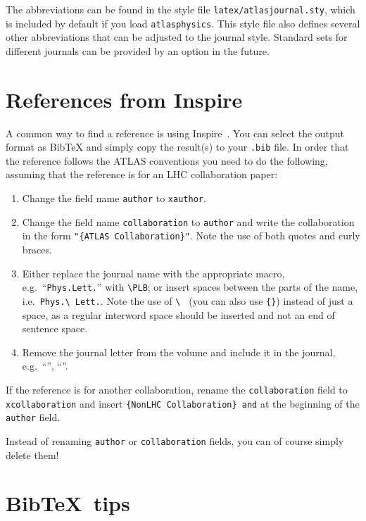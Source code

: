 \documentclass[UKenglish]{latex/atlasdoc}
\newcommand*{\BibTeX}{Bib\TeX}
\newcommand{\File}[1]{\texttt{#1}\xspace}
\newcommand{\Package}[1]{\texttt{#1}\xspace}
\begin{document}
The abbreviations can be found in the style file \File{latex/atlasjournal.sty},
which is included by default if you load \Package{atlasphysics}.
This style file also defines several other abbreviations that can be adjusted to the
journal style. 
Standard sets for different journals can be provided by an option in the future.

\section{References from Inspire}
\label{sc:inquire}

A common way to find a reference is using Inspire~\cite{inspire}.
You can select the output format as BibTeX and simply copy the result(s) to your \File{.bib} file.
In order that the reference follows the ATLAS conventions you need to do the following,
assuming that the reference is for an LHC collaboration paper:
\begin{enumerate}
\item Change the field name \texttt{author} to \texttt{xauthor}.
\item Change the field name \texttt{collaboration} to \texttt{author} and write the collaboration in the form
	\verb|"{ATLAS Collaboration}"|. Note the use of both quotes and curly braces.
\item Either replace the journal name with the appropriate macro, e.g.\ ``\texttt{Phys.Lett.}'' with
	\verb|\PLB|; or insert spaces between the parts of the name, i.e.\ \verb|Phys.\ Lett.|.
	Note the use of \verb|\ | (you can also use \verb|{}|) instead of just a space, 
	as a regular interword space should be inserted and not an end of sentence space.
\item Remove the journal letter from the volume and include it in the journal, e.g.\ ``\EPJC'', ``\PRD''. 
\end{enumerate}
If the reference is for another collaboration, rename the \texttt{collaboration} field to
\texttt{xcollaboration} and insert \verb|{NonLHC Collaboration} and| at the beginning of the 
\texttt{author} field.

Instead of renaming \texttt{author} or \texttt{collaboration} fields, you can of course simply delete them!


\section{\BibTeX\ tips}
\end{document}
